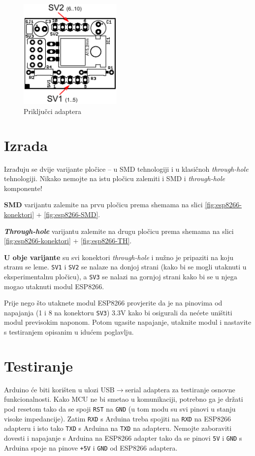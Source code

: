 \documentclass[times, utf8, zavrsni, numeric, sort]{fer}
\begin{document}
\begin{figure}[htb]
	\centering
	\includegraphics[width=5cm]{./Sklopovi/ESP8266/pinout.pdf}
	\caption{Priključci adaptera}
	\label{fig:esp8266-pinout}
\end{figure}

\section{Izrada}

Izrađuju se dvije varijante pločice -- u SMD tehnologiji i u klasičnoh \textit{through-hole} tehnologiji. Nikako nemojte na istu pločicu zalemiti i SMD i \textit{through-hole} komponente!

\textbf{SMD} varijantu zalemite na prvu pločicu prema shemama na slici \ref{fig:esp8266-konektori} + \ref{fig:esp8266-SMD}.

\textbf{\textit{Through-hole}} varijantu zalemite na drugu pločicu prema shemama na slici \ref{fig:esp8266-konektori} + \ref{fig:esp8266-TH}.

\textbf{U obje varijante} su svi konektori \textit{through-hole} i nužno je pripaziti na koju stranu se leme. \texttt{SV1} i \texttt{SV2} se nalaze na donjoj strani (kako bi se mogli utaknuti u eksperimentalnu pločicu), a \texttt{SV3} se nalazi na gornjoj strani kako bi se u njega mogao utaknuti modul ESP8266.

Prije nego što utaknete modul ESP8266 provjerite da je na pinovima od napajanja (1 i 8 na konektoru \texttt{SV3}) 3.3V kako bi osigurali da nećete uništiti modul previsokim naponom. Potom ugasite napajanje, utaknite modul i nastavite s testiranjem opisanim u idućem poglavlju.

\section{Testiranje}

Arduino će biti korišten u ulozi USB$\rightarrow$serial adaptera za testiranje osnovne funkcionalnosti. Kako MCU ne bi smetao u komunikaciji, potrebno ga je držati pod resetom tako da se spoji \texttt{RST} na \texttt{GND} (u tom modu su svi pinovi u stanju visoke impedancije). Zatim \texttt{RXD} s Arduina treba spojiti na \texttt{RXD} na ESP8266 adapteru i isto tako \texttt{TXD} s Arduina na \texttt{TXD} na adapteru. Nemojte zaboraviti dovesti i napajanje s Arduina na ESP8266 adapter tako da se pinovi \texttt{5V} i \texttt{GND} s Arduina spoje na pinove \texttt{+5V} i \texttt{GND} od ESP8266 adaptera.
\end{document}
